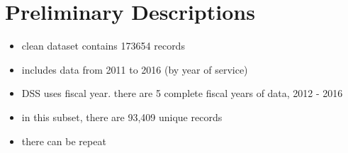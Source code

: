 \documentclass[12pt,letterpaperpaper,]{book}
\providecommand{\tightlist}{%
  \setlength{\itemsep}{0pt}\setlength{\parskip}{0pt}}
\begin{document}
\section{Preliminary Descriptions}\label{preliminary-descriptions}

\begin{itemize}
\tightlist
\item
  clean dataset contains 173654 records
\item
  includes data from 2011 to 2016 (by year of service)
\item
  DSS uses fiscal year. there are 5 complete fiscal years of data, 2012
  - 2016
\item
  in this subset, there are 93,409 unique records
\item
  there can be repeat
\end{itemize}



\backmatter
\printindex
\end{document}
